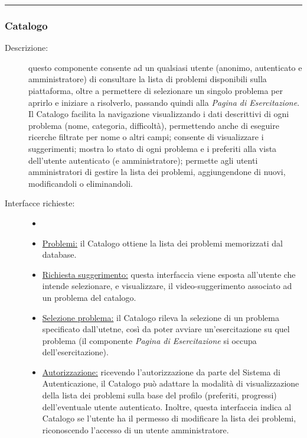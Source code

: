 \documentclass[11pt, a4paper]{article}
\theoremstyle{definition} %
\begin{document}
\begin{center}
    \rule{5cm}{1pt}
\end{center}

\subsubsection{Catalogo}
\begin{description}
    \item[Descrizione:] questo componente consente ad un qualsiasi utente
    (anonimo, autenticato e amministratore) di consultare la lista di problemi
    disponibili sulla piattaforma, oltre a permettere di selezionare un singolo
    problema per aprirlo e iniziare a risolverlo, passando quindi alla \textit{Pagina di
    Esercitazione}.
    Il Catalogo facilita la navigazione visualizzando i dati descrittivi di ogni
    problema (nome, categoria, difficoltà), permettendo anche di eseguire ricerche
    filtrate per nome o altri campi; consente di visualizzare i suggerimenti;
    mostra lo stato di ogni problema e i
    preferiti alla vista dell'utente autenticato (e amministratore); permette
    agli utenti amministratori di gestire la lista dei problemi, aggiungendone di
    nuovi, modificandoli o eliminandoli.

    \item[Interfacce richieste:]
    \begin{itemize}
        \item[]

        \item \underline{Problemi:} il Catalogo ottiene la lista dei problemi
        memorizzati dal database.

        \item \underline{Richiesta suggerimento:} questa interfaccia
        viene esposta all'utente che intende selezionare, e visualizzare,
        il video-suggerimento associato ad un problema del catalogo.

        \item \underline{Selezione problema:} il Catalogo rileva la
        selezione di un problema specificato dall'utetne, così da
        poter avviare un'esercitazione su quel problema (il componente
        \textit{Pagina di Esercitazione} si occupa dell'esercitazione).

        \item \underline{Autorizzazione:} ricevendo l'autorizzazione
        da parte del Sistema di Autenticazione, il Catalogo può adattare
        la modalità di visualizzazione della lista dei problemi sulla
        base del profilo (preferiti, progressi) dell'eventuale utente
        autenticato. Inoltre, questa interfaccia indica al Catalogo
        se l'utente ha il permesso di modificare la lista dei problemi,
        riconoscendo l'accesso di un utente amministratore.


\end{itemize}
\end{description}
\end{document}

